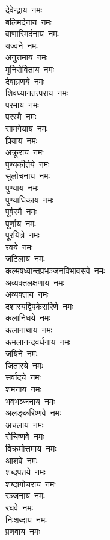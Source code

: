 \begin{multicols}{2}
\begin{flushleft}
देवेन्द्राय~नमः\\
बलिमर्दनाय~नमः\\
वाणारिमर्दनाय~नमः\\
यज्वने~नमः\\
अनुत्तमाय~नमः\\
मुनिसेविताय~नमः\\
देवाग्रणये~नमः\\
शिवध्यानतत्पराय~नमः\\
परमाय~नमः\\
परस्मै~नमः\hfill{}\\
सामगेयाय~नमः\\
प्रियाय~नमः\\
अक्रूराय~नमः\\
पुण्यकीर्तये~नमः\\
सुलोचनाय~नमः\\
पुण्याय~नमः\\
पुण्याधिकाय~नमः\\
पूर्वस्मै~नमः\\
पूर्णाय~नमः\\
पूरयित्रे~नमः\hfill{}\\
रवये~नमः\\
जटिलाय~नमः\\
कल्मषध्वान्तप्रभञ्जन\-विभावसवे~नमः\\
अव्यक्तलक्षणाय~नमः\\
अव्यक्ताय~नमः\\
दशास्यद्विपकेसरिणे~नमः\\
कलानिधये~नमः\\
कलानाथाय~नमः\\
कमलानन्दवर्धनाय~नमः\\
जयिने~नमः\hfill{}\\
जितारये~नमः\\
सर्वादये~नमः\\
शमनाय~नमः\\
भवभञ्जनाय~नमः\\
अलङ्करिष्णवे~नमः\\
अचलाय~नमः\\
रोचिष्णवे~नमः\\
विक्रमोत्तमाय~नमः\\
आशवे~नमः\\
शब्दपतये~नमः\hfill{}\\
शब्दागोचराय~नमः\\
रञ्जनाय~नमः\\
रघवे~नमः\\
निःशब्दाय~नमः\\
प्रणवाय~नमः\\

\end{flushleft}
\end{multicols}
